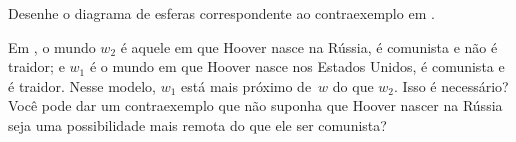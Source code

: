 \documentclass[../../../include/open-logic-section]{subfiles}
\begin{document}
\begin{prob}
Desenhe o diagrama de esferas correspondente ao contraexemplo em
.
\end{prob}

\begin{prob}
  Em , o mundo $w_2$ é aquele em que
  Hoover nasce na Rússia, é comunista e não é traidor; e
  $w_1$ é o mundo em que Hoover nasce nos Estados Unidos, é comunista
  e é traidor. Nesse modelo, $w_1$ está mais próximo de~$w$ do que
  $w_2$. Isso é necessário? Você pode dar um contraexemplo que
  não suponha que Hoover nascer na Rússia seja uma possibilidade mais remota
  do que ele ser comunista?
\end{prob}
\end{document}
